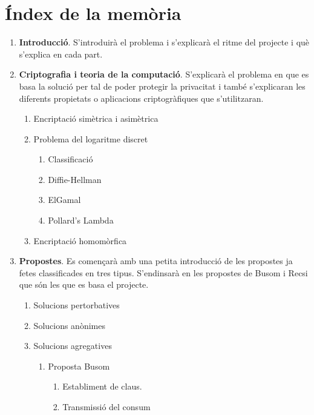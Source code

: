 \documentclass{article}
\begin{document}
	\section{Índex de la memòria}
	\begin{enumerate}
		\item \textbf{Introducció}. S'introduirà el problema i s'explicarà el ritme del projecte i què s'explica en cada part.
		\item \textbf{Criptografia i teoria de la computació}. S'explicarà el problema en que es basa la solució per tal de poder protegir la privacitat i també s'explicaran les diferents propietats o aplicacions criptogràfiques que s'utilitzaran.
		\begin{enumerate}
			\item Encriptació  simètrica i asimètrica
			\item Problema del logaritme discret
			\begin{enumerate}
				\item Classificació
				\item Diffie-Hellman
				\item ElGamal
				\item Pollard's Lambda
			\end{enumerate}
			\item Encriptació homomòrfica
		\end{enumerate}
		\item \textbf{Propostes}. Es començarà amb una petita introducció de les propostes ja fetes classificades en tres tipus. S'endinsarà en les propostes de Busom i Recsi que són les que es basa el projecte.
		\begin{enumerate}
			\item Solucions pertorbatives
			\item Solucions anònimes
			\item Solucions agregatives
			\begin{enumerate}
				\item Proposta Busom
				\begin{enumerate}
				
						\item Establiment de claus.
						\item Transmissió del consum
					

\end{enumerate}
\end{enumerate}
\end{enumerate}
\end{enumerate}
\end{document}
